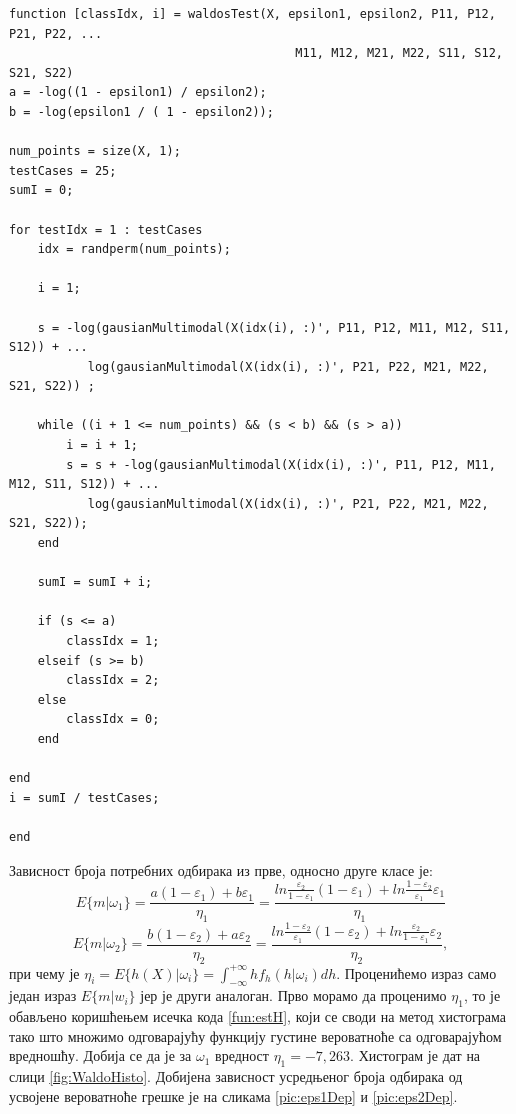 \begin{lstlisting}[caption={Одређивање припадностие},label={fun:waldoTest}]
function [classIdx, i] = waldosTest(X, epsilon1, epsilon2, P11, P12, P21, P22, ...
                                        M11, M12, M21, M22, S11, S12, S21, S22)
a = -log((1 - epsilon1) / epsilon2);
b = -log(epsilon1 / ( 1 - epsilon2));

num_points = size(X, 1);
testCases = 25;
sumI = 0;

for testIdx = 1 : testCases
    idx = randperm(num_points);

    i = 1;

    s = -log(gausianMultimodal(X(idx(i), :)', P11, P12, M11, M12, S11, S12)) + ...
           log(gausianMultimodal(X(idx(i), :)', P21, P22, M21, M22, S21, S22)) ;
    
    while ((i + 1 <= num_points) && (s < b) && (s > a))
        i = i + 1;
        s = s + -log(gausianMultimodal(X(idx(i), :)', P11, P12, M11, M12, S11, S12)) + ...
           log(gausianMultimodal(X(idx(i), :)', P21, P22, M21, M22, S21, S22));
    end

    sumI = sumI + i;

    if (s <= a)
        classIdx = 1;
    elseif (s >= b)
        classIdx = 2;
    else 
        classIdx = 0;
    end

end
i = sumI / testCases;

end
\end{lstlisting}


Зависност броја потребних одбирака из прве, односно друге класе је:
$$E\{m|\omega_1\} = \frac{a(1-\varepsilon_1) + b\varepsilon_1}{\eta_1}=\frac{ln\frac{\varepsilon_2}{1-\varepsilon_1}(1-\varepsilon_1) + ln\frac{1-\varepsilon_2}{\varepsilon_1} \varepsilon_1}{\eta_1}$$
$$E\{m|\omega_2\} = \frac{b(1-\varepsilon_2) + a\varepsilon_2}{\eta_2}=\frac{ln\frac{1-\varepsilon_2}{\varepsilon_1}(1-\varepsilon_2) + ln\frac{\varepsilon_2}{1-\varepsilon_1} \varepsilon_2}{\eta_2},$$
при чему је $\eta_i =E\{h(X)|\omega_i\} = \int_{-\infty}^{+\infty}hf_h(h|\omega_i)dh $. Проценићемо израз само један израз $E\{m|w_i\}$ јер је други аналоган. Прво морамо да проценимо $\eta_1$, то је обављено коришћењем исечка кода \ref{fun:estH}, који се своди на метод хистограма тако што множимо одговарајућу функцију густине вероватноће са одговарајућом вредношћу. Добија се да је за $\omega_1$ вредност $\eta_1 =-7,263$. Хистограм је дат на слици \ref{fig:WaldoHisto}. Добијена зависност усредњеног броја одбирака од усвојене вероватноће грешке је на сликама \ref{pic:eps1Dep} и \ref{pic:eps2Dep}.

